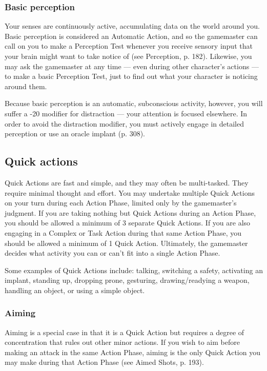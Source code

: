 \subsubsection{Basic perception} 

Your senses are continuously active, accumulating data on the world around you. Basic perception is considered an Automatic Action, and so the gamemaster can call on you to make a Perception Test whenever you receive sensory input that your brain might want to take notice of (see Perception, p. 182). Likewise, you may ask the gamemaster at any time --- even during other character’s actions --- to make a basic Perception Test, just to find out what your character is noticing around them. 

Because basic perception is an automatic, subconscious activity, however, you will suffer a -20 modifier for distraction --- your attention is focused elsewhere. In order to avoid the distraction modifier, you must actively engage in detailed perception or use an oracle implant (p. 308). 



\subsection{Quick actions} \label{sec:combat-quick-actions} 

Quick Actions are fast and simple, and they may often be multi-tasked. They require minimal thought and effort. You may undertake multiple Quick Actions on your turn during each Action Phase, limited only by the gamemaster’s judgment. If you are taking nothing but Quick Actions during an Action Phase, you should be allowed a minimum of 3 separate Quick Actions. If you are also engaging in a Complex or Task Action during that same Action Phase, you should be allowed a minimum of 1 Quick Action. Ultimately, the gamemaster decides what activity you can or can’t fit into a single Action Phase. 

Some examples of Quick Actions include: talking, switching a safety, activating an implant, standing up, dropping prone, gesturing, drawing/readying a weapon, handling an object, or using a simple object. 



\subsubsection{Aiming} 

Aiming is a special case in that it is a Quick Action but requires a degree of concentration that rules out other minor actions. If you wish to aim before making an attack in the same Action Phase, aiming is the only Quick Action you may make during that Action Phase (see Aimed Shots, p. 193). 

